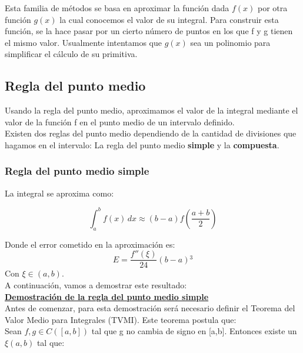 \documentclass{article}
\begin{document}
Esta familia de métodos se basa en aproximar la función dada $f(x)$ por otra función $g(x)$ la cual conocemos el valor de su integral. Para  construir esta función, se la hace pasar por un cierto número de puntos en los que f y g tienen el mismo valor. Usualmente intentamos que $g(x)$ sea un polinomio para simplificar el cálculo de su primitiva.

	\subsection{Regla del punto medio}

		Usando la regla del punto medio, aproximamos el valor de la integral mediante el valor de la función f en el punto medio de un intervalo definido. \\
	
		Existen dos reglas del punto medio dependiendo de la cantidad de divisiones que hagamos en el intervalo: La regla del punto medio \textbf{simple} y la \textbf{compuesta}.
		
			\subsubsection{Regla del punto medio simple}
			
			La integral se aproxima como:
			
			\begin{equation}
				\int_{a}^{b} f(x) \,dx \approx (b-a)f\left(\frac{a+b}{2}\right)  
			\end{equation}
			
			Donde el error cometido en la aproximación es:
			\begin{equation}
				E = \frac{f''(\xi)}{24} (b - a){^3}
			\end{equation}
			Con $\xi \in (a,b)$. \\
			
			A continuación, vamos a demostrar este resultado:\\
			
			\underline{\textbf{Demostración de la regla del punto medio simple}} \\
			
			Antes de comenzar, para esta demostración será necesario definir  el Teorema del Valor Medio para Integrales (TVMI). Este teorema postula que:\\ 
			
			Sean $f,g \in C([a,b])$ tal que g no cambia de signo en [a,b]. Entonces existe un $\xi (a,b)$ tal que:
			
\end{document}
